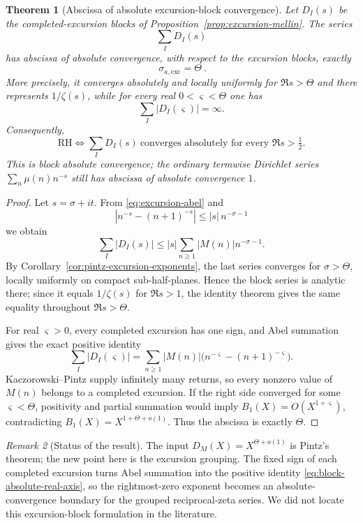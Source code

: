 \documentclass[11pt]{amsart}
\numberwithin{equation}{section}
\theoremstyle{plain}
\newtheorem{theorem}{Theorem}[section]
\theoremstyle{definition}
\theoremstyle{remark}
\newtheorem{remark}[theorem]{Remark}
\begin{document}
\begin{theorem}[Abscissa of absolute excursion-block convergence]
\label{thm:excursion-block-abscissa}
Let $D_I(s)$ be the completed-excursion blocks of
Proposition~\ref{prop:excursion-mellin}.  The series
\[
 \sum_I D_I(s)
\]
has abscissa of absolute convergence, with respect to the excursion blocks,
exactly
\[
 \boxed{\ \sigma_{a,\mathrm{exc}}=\Theta\ }.
\]
More precisely, it converges absolutely and locally uniformly for
$\Re s>\Theta$ and there represents $1/\zeta(s)$, while for every real
$0<\varsigma<\Theta$ one has
\[
 \sum_I|D_I(\varsigma)|=\infty.
\]
Consequently,
\[
 \mathrm{RH}\iff
 \sum_I D_I(s)\ \text{converges absolutely for every }\Re s>\tfrac12.
\]
This is block absolute convergence; the ordinary termwise Dirichlet series
$\sum_n\mu(n)n^{-s}$ still has abscissa of absolute convergence $1$.
\end{theorem}

\begin{proof}
Let $s=\sigma+it$.  From \eqref{eq:excursion-abel} and
\[
 |n^{-s}-(n+1)^{-s}|\le |s|\,n^{-\sigma-1}
\]
we obtain
\[
 \sum_I|D_I(s)|
 \le |s|\sum_{n\ge1}|M(n)|n^{-\sigma-1}.
\]
By Corollary~\ref{cor:pintz-excursion-exponents}, the last series converges
for $\sigma>\Theta$, locally uniformly on compact sub-half-planes.  Hence
the block series is analytic there; since it equals $1/\zeta(s)$ for
$\Re s>1$, the identity theorem gives the same equality throughout
$\Re s>\Theta$.

For real $\varsigma>0$, every completed excursion has one sign, and Abel
summation gives the exact positive identity
\begin{equation}
\label{eq:block-absolute-real-axis}
 \sum_I|D_I(\varsigma)|
 =\sum_{n\ge1}|M(n)|
 \bigl(n^{-\varsigma}-(n+1)^{-\varsigma}\bigr).
\end{equation}
Kaczorowski--Pintz supply infinitely many returns, so every nonzero value of
$M(n)$ belongs to a completed excursion.  If the right side converged for
some $\varsigma<\Theta$, positivity and partial summation would imply
$B_1(X)=O(X^{1+\varsigma})$, contradicting
$B_1(X)=X^{1+\Theta+o(1)}$.  Thus the abscissa is exactly $\Theta$.
\end{proof}

\begin{remark}[Status of the result]
\label{rem:block-abscissa-status}
The input $D_M(X)=X^{\Theta+o(1)}$ is Pintz's theorem; the new point here is
the excursion grouping.  The fixed sign of each completed excursion turns
Abel summation into the positive identity
\eqref{eq:block-absolute-real-axis}, so the rightmost-zero exponent becomes
an absolute-convergence boundary for the grouped reciprocal-zeta series.
We did not locate this excursion-block formulation in the literature.
\end{remark}
\end{document}
